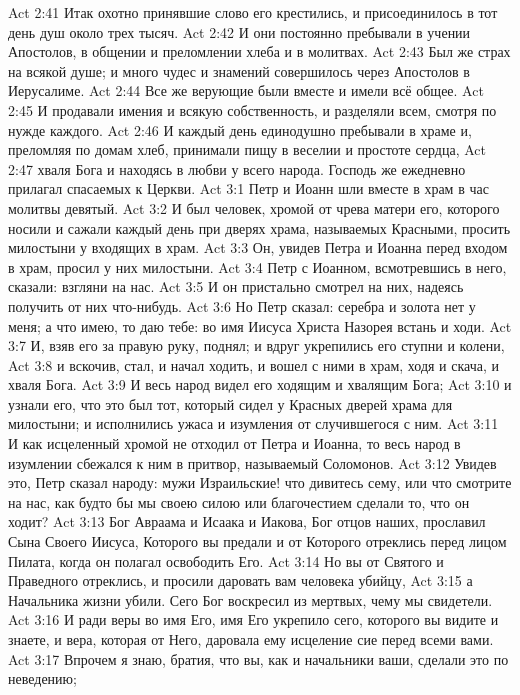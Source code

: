 \vs Act 2:41 Итак охотно принявшие слово его крестились, и присоединилось в тот день душ около трех тысяч.
\vs Act 2:42 И они постоянно пребывали в учении Апостолов, в общении и преломлении хлеба и в молитвах.
\vs Act 2:43 Был же страх на всякой душе; и много чудес и знамений совершилось через Апостолов в Иерусалиме.
\vs Act 2:44 Все же верующие были вместе и имели всё общее.
\vs Act 2:45 И продавали имения и всякую собственность, и разделяли всем, смотря по нужде каждого.
\vs Act 2:46 И каждый день единодушно пребывали в храме и, преломляя по домам хлеб, принимали пищу в веселии и простоте сердца,
\vs Act 2:47 хваля Бога и находясь в любви у всего народа. Господь же ежедневно прилагал спасаемых к Церкви.
\vs Act 3:1 Петр и Иоанн шли вместе в храм в час молитвы девятый.
\vs Act 3:2 И был человек, хромой от чрева матери его, которого носили и сажали каждый день при дверях храма, называемых Красными, просить милостыни у входящих в храм.
\vs Act 3:3 Он, увидев Петра и Иоанна перед входом в храм, просил у них милостыни.
\vs Act 3:4 Петр с Иоанном, всмотревшись в него, сказали: взгляни на нас.
\vs Act 3:5 И он пристально смотрел на них, надеясь получить от них что-нибудь.
\vs Act 3:6 Но Петр сказал: серебра и золота нет у меня; а что имею, то даю тебе: во имя Иисуса Христа Назорея встань и ходи.
\vs Act 3:7 И, взяв его за правую руку, поднял; и вдруг укрепились его ступни и колени,
\vs Act 3:8 и вскочив, стал, и начал ходить, и вошел с ними в храм, ходя и скача, и хваля Бога.
\vs Act 3:9 И весь народ видел его ходящим и хвалящим Бога;
\vs Act 3:10 и узнали его, что это был тот, который сидел у Красных дверей храма для милостыни; и исполнились ужаса и изумления от случившегося с ним.
\rsbpar\vs Act 3:11 И как исцеленный хромой не отходил от Петра и Иоанна, то весь народ в изумлении сбежался к ним в притвор, называемый Соломонов.
\vs Act 3:12 Увидев это, Петр сказал народу: мужи Израильские! что дивитесь сему, или что смотрите на нас, как будто бы мы своею силою или благочестием сделали то, что он ходит?
\vs Act 3:13 Бог Авраама и Исаака и Иакова, Бог отцов наших, прославил Сына Своего Иисуса, Которого вы предали и от Которого отреклись перед лицом Пилата, когда он полагал освободить Его.
\vs Act 3:14 Но вы от Святого и Праведного отреклись, и просили даровать вам человека убийцу,
\vs Act 3:15 а Начальника жизни убили. Сего Бог воскресил из мертвых, чему мы свидетели.
\vs Act 3:16 И ради веры во имя Его, имя Его укрепило сего, которого вы видите и знаете, и вера, которая от Него, даровала ему исцеление сие перед всеми вами.
\vs Act 3:17 Впрочем я знаю, братия, что вы, как и начальники ваши, сделали это по неведению;
